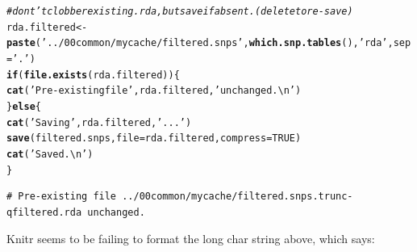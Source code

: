 \documentclass{article}\usepackage[]{graphicx}\usepackage[]{color}
\makeatletter
\newcommand{\hlnum}[1]{\textcolor[rgb]{0.686,0.059,0.569}{#1}}%
\newcommand{\hlstr}[1]{\textcolor[rgb]{0.192,0.494,0.8}{#1}}%
\newcommand{\hlcom}[1]{\textcolor[rgb]{0.678,0.584,0.686}{\textit{#1}}}%
\newcommand{\hlstd}[1]{\textcolor[rgb]{0.345,0.345,0.345}{#1}}%
\newcommand{\hlkwa}[1]{\textcolor[rgb]{0.161,0.373,0.58}{\textbf{#1}}}%
\newcommand{\hlkwb}[1]{\textcolor[rgb]{0.69,0.353,0.396}{#1}}%
\newcommand{\hlkwc}[1]{\textcolor[rgb]{0.333,0.667,0.333}{#1}}%
\newcommand{\hlkwd}[1]{\textcolor[rgb]{0.737,0.353,0.396}{\textbf{#1}}}%
\newenvironment{kframe}{%
 \def\at@end@of@kframe{}%
 \ifinner\ifhmode%
  \def\at@end@of@kframe{\end{minipage}}%
  \begin{minipage}{\columnwidth}%
 \fi\fi%
 \def\FrameCommand##1{\hskip\@totalleftmargin \hskip-\fboxsep
 \colorbox{shadecolor}{##1}\hskip-\fboxsep
     \hskip-\linewidth \hskip-\@totalleftmargin \hskip\columnwidth}%
 \MakeFramed {\advance\hsize-\width
   \@totalleftmargin\z@ \linewidth\hsize
   \@setminipage}}%
 {\par\unskip\endMakeFramed%
 \at@end@of@kframe}
\newenvironment{knitrout}{}{} %
\makeatother
\begin{document}
\begin{knitrout}
\begin{kframe}
\begin{alltt}
\hlcom{# dont't clobber existing .rda, but save if absent.  (delete to re-save)}
\hlstd{rda.filtered} \hlkwb{<-} \hlkwd{paste}\hlstd{(}\hlstr{'../00common/mycache/filtered.snps'}\hlstd{,} \hlkwd{which.snp.tables}\hlstd{(),} \hlstr{'rda'}\hlstd{,} \hlkwc{sep}\hlstd{=}\hlstr{'.'}\hlstd{)}
\hlkwa{if}\hlstd{(}\hlkwd{file.exists}\hlstd{(rda.filtered))\{}
  \hlkwd{cat}\hlstd{(}\hlstr{'Pre-existing file'}\hlstd{, rda.filtered,} \hlstr{'unchanged.\textbackslash{}n'}\hlstd{)}
\hlstd{\}} \hlkwa{else} \hlstd{\{}
  \hlkwd{cat}\hlstd{(}\hlstr{'Saving'}\hlstd{, rda.filtered,} \hlstr{'...'}\hlstd{)}
  \hlkwd{save}\hlstd{(filtered.snps,} \hlkwc{file}\hlstd{=rda.filtered,} \hlkwc{compress}\hlstd{=}\hlnum{TRUE}\hlstd{)}
  \hlkwd{cat}\hlstd{(}\hlstr{'Saved.\textbackslash{}n'}\hlstd{)}
\hlstd{\}}
\end{alltt}
\begin{verbatim}
# Pre-existing file ../00common/mycache/filtered.snps.trunc-qfiltered.rda unchanged.
\end{verbatim}
\end{kframe}
\end{knitrout}

Knitr seems to be failing to format the long char string above, which says:
\end{document}
